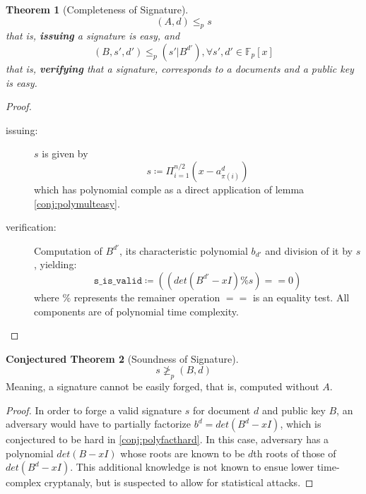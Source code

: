 \documentclass[a4paper,10pt]{article}
\theoremstyle{plain}
\newtheorem{thm}{Theorem}[section] %
\theoremstyle{definition}
\newtheorem{cthm}[thm]{Conjectured Theorem} %
\theoremstyle{named}
\begin{document}
\begin{thm}[Completeness of Signature]
  \[(A,d) \leq_p s\]
  that is, \textbf{issuing} a signature is easy, and 
  \[(B,s',d') \leq_p (s'|B^{d'}), \forall s', d' \in \mathbb{F}_p[x]\]
   that is, \textbf{verifying} that a signature, corresponds to a documents and a public key is easy.
\end{thm}
\begin{proof}
$\,$
\begin{description}
\item [issuing:] $s$ is given by \[s \coloneqq \Pi_{i = 1}^{n/2} (x-a_{\pi(i)}^d)\] which has polynomial comple as a direct application of lemma \ref{conj:polymulteasy}.%
\item [verification:] Computation of $B^{d'}$, its characteristic polynomial $b_{d'}$ and division of it by $s$, yielding: \[\mathtt{s\_is\_valid} \coloneqq ((det(B^{d'}-xI)\%s) == 0)\] where $\%$ represents the remainer operation $==$ is an equality test. All components are of polynomial time complexity.
\end{description}
\end{proof}

\begin{cthm}[Soundness of Signature]
  \[s \ngeq_p (B,d)\]
  Meaning, a signature cannot be easily forged, that is, computed without $A$.
\end{cthm}
\begin{proof}
In order to forge a valid signature $s$ for document $d$ and public key $B$, an adversary would have to partially factorize $b^d = det(B^{d}-xI)$, which is conjectured to be hard in \ref{conj:polyfacthard}. In this case, adversary has a polynomial $det(B-xI)$ whose roots are known to be $d$th roots of those of $det(B^{d}-xI)$. This additional knowledge is not known to ensue lower time-complex cryptanaly, but is suspected to allow for statistical attacks.
\end{proof}
\end{document}
